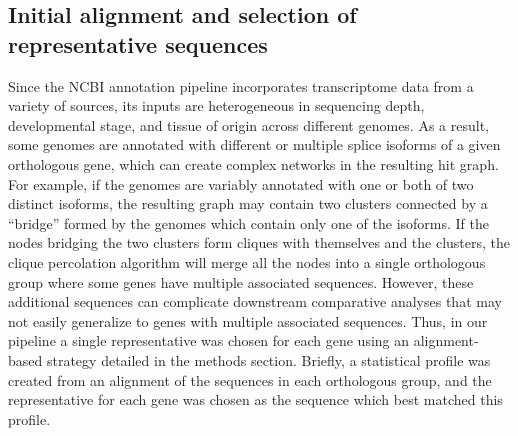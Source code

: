 \subsection{Initial alignment and selection of representative sequences}
Since the NCBI annotation pipeline incorporates transcriptome data from a variety of sources, its inputs are heterogeneous in sequencing depth, developmental stage, and tissue of origin across different genomes. As a result, some genomes are annotated with different or multiple splice isoforms of a given orthologous gene, which can create complex networks in the resulting hit graph. For example, if the genomes are variably annotated with one or both of two distinct isoforms, the resulting graph may contain two clusters connected by a ``bridge'' formed by the genomes which contain only one of the isoforms. If the nodes bridging the two clusters form cliques with themselves and the clusters, the clique percolation algorithm will merge all the nodes into a single orthologous group where some genes have multiple associated sequences. However, these additional sequences can complicate downstream comparative analyses that may not easily generalize to genes with multiple associated sequences. Thus, in our pipeline a single representative was chosen for each gene using an alignment-based strategy detailed in the methods section. Briefly, a statistical profile was created from an alignment of the sequences in each orthologous group, and the representative for each gene was chosen as the sequence which best matched this profile.

